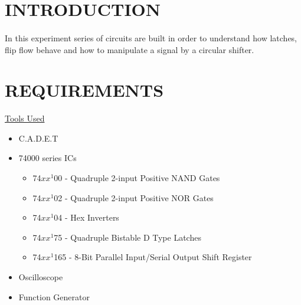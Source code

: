 \documentclass[pdftex,12pt,a4paper]{article}
\begin{document}

\setcounter{page}{1}
\section{INTRODUCTION }
\begin{flushleft}
\paragraph{} 
In this experiment series of circuits are built in order to understand how latches, flip flow behave and how to manipulate a signal by a circular shifter.
\end{flushleft}
  

\section{REQUIREMENTS}

\begin{flushleft}
\underline{Tools Used}\cite{booklet}
\end{flushleft}
\begin{itemize}
    \item C.A.D.E.T
    \item 74000 series ICs
    \begin{itemize}
        \item 74$xx^{1}$00 - Quadruple 2-input Positive NAND Gates
        \item 74$xx^{1}$02 - Quadruple 2-input Positive NOR Gates
        \item 74$xx^{1}$04 - Hex Inverters
        \item 74$xx^{1}$75 - Quadruple Bistable D Type Latches
        \item 74$xx^{1}$165 - 8-Bit Parallel Input/Serial Output Shift Register
    \end{itemize}
    \item Oscilloscope
    \item Function Generator
\end{itemize}
\end{document}
